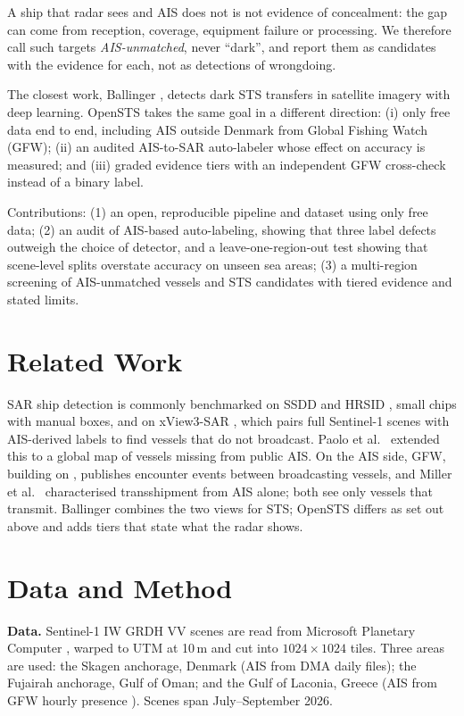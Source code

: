 \documentclass[conference]{IEEEtran}
\begin{document}
A ship that radar sees and AIS does not is not evidence of concealment: the gap can
come from reception, coverage, equipment failure or processing. We therefore call such
targets \emph{AIS-unmatched}, never ``dark'', and report them as candidates with the
evidence for each, not as detections of wrongdoing.

The closest work, Ballinger \cite{ballinger2024}, detects dark STS transfers in
satellite imagery with deep learning. OpenSTS takes the same goal in a different
direction: (i) only free data end to end, including AIS outside Denmark from Global
Fishing Watch (GFW); (ii) an audited AIS-to-SAR auto-labeler whose effect on accuracy is
measured; and (iii) graded evidence tiers with an independent GFW cross-check instead
of a binary label.

Contributions: (1) an open, reproducible pipeline and dataset using only free data;
(2) an audit of AIS-based auto-labeling, showing that three label defects outweigh the
choice of detector, and a leave-one-region-out test showing that scene-level splits
overstate accuracy on unseen sea areas; (3) a multi-region screening of AIS-unmatched vessels and STS
candidates with tiered evidence and stated limits.

\section{Related Work}
\label{sec:related}
SAR ship detection is commonly benchmarked on SSDD \cite{li2017} and HRSID
\cite{wei2020}, small chips with manual boxes, and on xView3-SAR \cite{paolo2022},
which pairs full Sentinel-1 scenes with AIS-derived labels to find vessels that do not
broadcast. Paolo et al.\ \cite{paolo2024} extended this to a global map of vessels
missing from public AIS. On the AIS side, GFW, building on \cite{kroodsma2018},
publishes encounter events between broadcasting vessels, and Miller et
al.\ \cite{miller2018} characterised transshipment from AIS alone; both see only
vessels that transmit. Ballinger \cite{ballinger2024} combines the two views for STS;
OpenSTS differs as set out above and adds tiers that state what the radar shows.

\section{Data and Method}
\label{sec:method}


\textbf{Data.} Sentinel-1 IW GRDH VV scenes are read from Microsoft Planetary Computer
\cite{pc2022}, warped to UTM at 10\,m and cut into $1024\times1024$ tiles. Three areas
are used: the Skagen anchorage, Denmark (AIS from DMA daily files); the Fujairah
anchorage, Gulf of Oman; and the Gulf of Laconia, Greece (AIS from GFW hourly presence
\cite{kroodsma2018}). Scenes span July--September 2026. %
\end{document}
